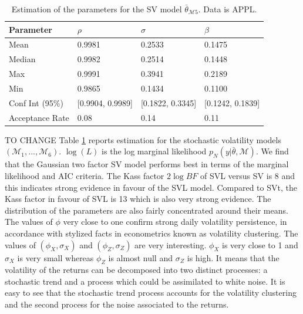 \documentclass[11pt,a4,twosided,singlespacing,titlepagenumber=on]{scrreprt}
\numberwithin{equation}{chapter} %
\theoremstyle{remark}
\begin{document}
\begin{table}[htb]
\centering
\begin{tabular}{llll}
\label{marginal_log_lik_appl}
Parameter    		& $\rho$ & $\sigma$ & $\beta$ \\ 
\hline
Mean            & 0.9981              & 0.2533             & 0.1475\\
Median          & 0.9982              & 0.2514             & 0.1448\\
Max             & 0.9991              & 0.3941             & 0.2189\\
Min             & 0.9865              & 0.1434             & 0.1100\\
Conf Int (95\%) & [0.9904, 0.9989]    & [0.1822, 0.3345]   & [0.1242, 0.1839]\\
Acceptance Rate & 0.08                & 0.14               & 0.11 \\
\hline
\end{tabular}
\caption{Estimation of the parameters for the SV model $\bar{\theta}_{\mathcal{M}5}$. Data is APPL.}
\end{table}

TO CHANGE
Table \ref{marginal_log_lik_appl} reports estimation for the stochastic volatility models $(\mathcal{M}_1, ..., \mathcal{M}_6)$. $\log (L)$ is the log marginal likelihood $p_N(y|\bar{\theta}, \mathcal{M})$. We find that the Gaussian two factor SV model performs best in terms of the marginal likelihood and AIC criteria. The Kass factor $2 \log BF$ of SVL versus SV is 8 and this indicates strong evidence in favour of the SVL model. Compared to SVt, the Kass factor in favour of SVL is 13 which is also very strong evidence. The distribution of the parameters are also fairly concentrated around their means. The values of $\phi$ very close to one confirm strong daily volatility persistence, in accordance with stylized facts in econometrics known as volatility clustering. The values of $(\phi_X, \sigma_X)$ and $(\phi_Z, \sigma_Z)$ are very interesting. $\phi_X$ is very close to 1 and $\sigma_X$ is very small whereas $\phi_Z$ is almost null and $\sigma_Z$ is high. It means that the volatility of the returns can be decomposed into two distinct processes: a stochastic trend and a process which could be assimilated to white noise. It is easy to see that the stochastic trend process accounts for the volatility clustering and the second process for the noise associated to the returns.
\end{document}
